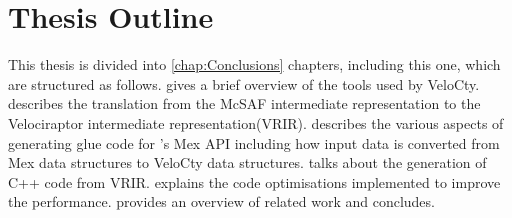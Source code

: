 \section{Thesis Outline}
This thesis is divided into \ref{chap:Conclusions} chapters, including this one, which are structured as follows.
 gives a brief overview of the tools
used by VeloCty.
 describes the translation from the McSAF  
intermediate representation to the Velociraptor intermediate representation(VRIR).
 describes the various aspects of generating glue code for \matlab's Mex API including how input data is converted from Mex data structures to VeloCty data structures. 
 talks about the generation of C++ code from VRIR.
 explains the code optimisations implemented to improve the performance. 
 provides an overview of related work and
 concludes.

